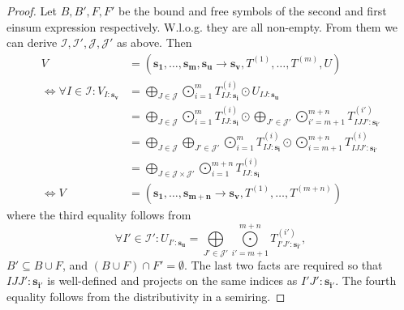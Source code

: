 \begin{proof}
    \small
    Let $B, B', F, F'$ be the bound and free symbols of the second and first einsum expression respectively.
    W.l.o.g. they are all non-empty.
    From them we can derive $\mathcal{I}, \mathcal{I}', \mathcal{J}, \mathcal{J}'$ as above.
    Then
    \begin{align*}
        V                                               & = (\bm{s_1},\dots,\bm{s_m}, \bm{s_u} \rightarrow \bm{s_v}, T^{(1)},\dots,T^{(m)}, U)                                                                                                                   \\
        \iff \forall I \in \mathcal{I}: V_{I: \bm{s_v}} & = \bigoplus\limits_{J \in \mathcal{J}} \bigodot\limits_{i = 1}^{m} T^{(i)}_{IJ:\bm{s_i}} \odot U_{IJ:\bm{s_u}}                                                                                         \\
                                                        & = \bigoplus\limits_{J \in \mathcal{J}} \bigodot\limits_{i = 1}^{m} T^{(i)}_{IJ:\bm{s_i}} \odot \bigoplus\limits_{J' \in \mathcal{J}'} \bigodot\limits_{i' = m + 1}^{m + n} T^{(i')}_{IJJ':\bm{s_{i'}}} \\
                                                        & = \bigoplus\limits_{J \in \mathcal{J}} \bigoplus\limits_{J' \in \mathcal{J}'} \bigodot\limits_{i = 1}^{m} T^{(i)}_{IJ:\bm{s_i}} \odot \bigodot\limits_{i = m + 1}^{m + n} T^{(i)}_{IJJ':\bm{s_{i'}}}   \\
                                                        & = \bigoplus\limits_{J \in \mathcal{J} \times \mathcal{J}'} \bigodot\limits_{i = 1}^{m + n} T^{(i)}_{IJ:\bm{s_i}}                                                                                       \\
        \iff V                                          & = (\bm{s_1}, \dots, \bm{s_{m + n}} \rightarrow \bm{s_v}, T^{(1)}, \dots, T^{(m + n)})
    \end{align*}
    where the third equality follows from
    $$\forall I' \in \mathcal{I}': U_{I': \bm{s_u}} = \bigoplus\limits_{J' \in \mathcal{J}'} \bigodot\limits_{i' = m + 1}^{m + n} T^{(i')}_{I'J':\bm{s_{i'}}},$$
    $B' \subseteq B \cup F$, and $(B \cup F) \cap F' = \emptyset$. The last two facts are required so that $IJJ':\bm{s_{i'}}$ is well-defined and projects on the same indices as $I'J':\bm{s_{i'}}$.
    The fourth equality follows from the distributivity in a semiring.
\end{proof}